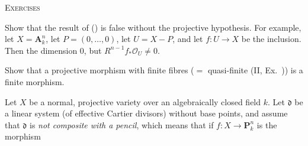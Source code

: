 {\par\smallskip\noindent\textsc{Exercises}\par
{} Show that the result of () is false without the projective hypothesis. For example, let $X=\mathbf A_k^n$, let $P=(0,\ldots,0)$, let $U=X-P$, and let $f\colon U\to X$ be the inclusion. Then the  dimension $0$, but $R^{n-1}f_*\mathcal O_U\ne0$.

 Show that a projective morphism with finite fibres ($=$ quasi-finite (II, Ex.~)) is a finite morphism.

 Let $X$ be a normal, projective variety over an algebraically closed field $k$. Let $\mathfrak d$ be a linear system (of effective Cartier divisors) without base points, and assume that $\mathfrak d$ is \emph{not composite with a pencil}, which means that if $f\colon X\to\mathbf P_k^n$ is the morphism
}
